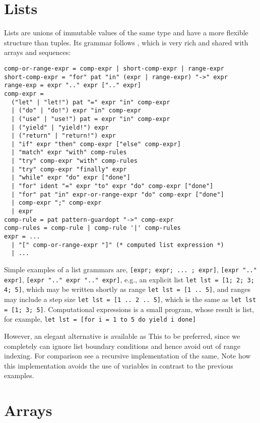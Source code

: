 \section{Lists}
Lists are unions of immutable values of the same type and have a more flexible structure than tuples. Its grammar follows , which is very rich and shared with arrays and sequences:
\begin{lstlisting}[language=ebnf]
comp-or-range-expr = comp-expr | short-comp-expr | range-expr
short-comp-expr = "for" pat "in" (expr | range-expr) "->" expr
range-exp = expr ".." expr [".." expr]
comp-expr =
  ("let" | "let!") pat "=" expr "in" comp-expr
  | ("do" | "do!") expr "in" comp-expr
  | ("use" | "use!") pat = expr "in" comp-expr
  | ("yield" | "yield!") expr
  | ("return" | "return!") expr
  | "if" expr "then" comp-expr ["else" comp-expr]
  | "match" expr "with" comp-rules
  | "try" comp-expr "with" comp-rules
  | "try" comp-expr "finally" expr
  | "while" expr "do" expr ["done"]
  | "for" ident "=" expr "to" expr "do" comp-expr ["done"]
  | "for" pat "in" expr-or-range-expr "do" comp-expr ["done"]
  | comp-expr ";" comp-expr
  | expr
comp-rule = pat pattern-guardopt "->" comp-expr
comp-rules = comp-rule | comp-rule '|' comp-rules
expr = ... 
  | "[" comp-or-range-expr "]" (* computed list expression *)
  | ...
\end{lstlisting}
Simple examples of a list grammars are, \lstinline[language=ebnf]![expr; expr; ... ; expr]!, \lstinline[language=ebnf]![expr ".." expr]!, \lstinline[language=ebnf]![expr ".." expr ".." expr]!, e.g., an explicit list \lstinline!let lst = [1; 2; 3; 4; 5]!, which may be written shortly as range \lstinline!let lst = [1 .. 5]!, and ranges may include a step size \lstinline!let lst = [1 .. 2 .. 5]!, which is the same as \lstinline!let lst = [1; 3; 5]!. Computational expressions is a small program, whose result is list, for example, \lstinline!let lst = [for i = 1 to 5 do yield i done]!



However, an elegant alternative is available as
This to be preferred, since we completely can ignore list boundary conditions and hence avoid out of range indexing. For comparison see a recursive implementation of the same,
Note how this implementation avoids the use of variables in contrast to the previous examples.




\section{Arrays}
